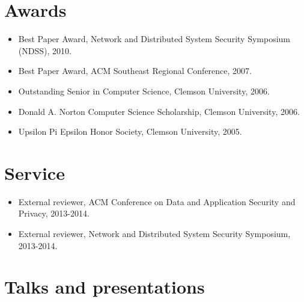 \documentclass[10pt,letterpaper]{article}
\begin{document}
\section*{Awards}

\begin{itemize}

  \item Best Paper Award, Network and Distributed System Security Symposium (NDSS), 2010.

  \item Best Paper Award, ACM Southeast Regional Conference, 2007.

  \item Outstanding Senior in Computer Science, Clemson University, 2006.

  \item Donald A. Norton Computer Science Scholarship, Clemson University, 2006.

  \item Upsilon Pi Epsilon Honor Society, Clemson University, 2005.

\end{itemize}

\section*{Service}

\begin{itemize}

  \item External reviewer, ACM Conference on Data and Application Security and Privacy, 2013-2014.

  \item External reviewer, Network and Distributed System Security Symposium, 2013-2014.

\end{itemize}

\section*{Talks and presentations}
\end{document}
